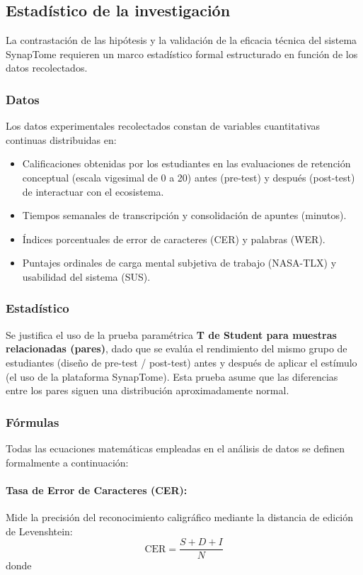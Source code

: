 \subsection{Estadístico de la investigación}

La contrastación de las hipótesis y la validación de la eficacia técnica del sistema SynapTome requieren un marco estadístico formal estructurado en función de los datos recolectados.

\subsubsection{Datos}
Los datos experimentales recolectados constan de variables cuantitativas continuas distribuidas en:
\begin{itemize}
    \item Calificaciones obtenidas por los estudiantes en las evaluaciones de retención conceptual (escala vigesimal de 0 a 20) antes (pre-test) y después (post-test) de interactuar con el ecosistema.
    \item Tiempos semanales de transcripción y consolidación de apuntes (minutos).
    \item Índices porcentuales de error de caracteres (CER) y palabras (WER).
    \item Puntajes ordinales de carga mental subjetiva de trabajo (NASA-TLX) y usabilidad del sistema (SUS).
\end{itemize}

\subsubsection{Estadístico}
Se justifica el uso de la prueba paramétrica \textbf{T de Student para muestras relacionadas (pares)}, dado que se evalúa el rendimiento del mismo grupo de estudiantes (diseño de pre-test / post-test) antes y después de aplicar el estímulo (el uso de la plataforma SynapTome). Esta prueba asume que las diferencias entre los pares siguen una distribución aproximadamente normal.

\subsubsection{Fórmulas}
Todas las ecuaciones matemáticas empleadas en el análisis de datos se definen formalmente a continuación:

\paragraph{Tasa de Error de Caracteres (CER):}
Mide la precisión del reconocimiento caligráfico mediante la distancia de edición de Levenshtein:
\begin{equation}
\text{CER} = \frac{S + D + I}{N}
\end{equation}
\noindent donde

